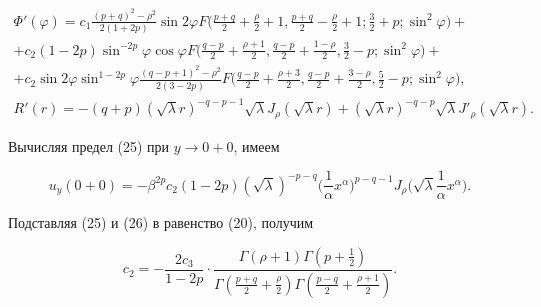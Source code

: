 \begin{gather*} 


\Phi'(\varphi)=c_1\frac{(p+q)^2-\rho^2}{2(1+2p)}\sin2\varphi F 


\bigg(\frac{p+q}{2}+\frac{\rho}{2}+1,\frac{p+q}{2} 


-\frac{\rho}{2}+1;\frac{3}{2}+p;\sin^2\varphi\bigg)+\\ 


% 


+c_2(1-2p)\sin^{-2p}\varphi\cos\varphi F\bigg( 


\frac{q-p}{2}+\frac{\rho+1}{2},\frac{q-p}{2} 


+\frac{1-\rho}{2},\frac{3}{2}-p;\sin^2\varphi\bigg)+ \\ 


% 


+c_2\sin2\varphi\sin^{1-2p}\varphi 


\frac{(q-p+1)^2-\rho^2}{2(3-2p)}F\bigg(\frac{q-p}{2} 


+\frac{\rho+3}{2},\frac{q-p}{2}+\frac{3-\rho}{2}, 


\frac{5}{2}-p;\sin^2\varphi\bigg), \\ 


% 


R'(r)=-(q+p)(\sqrt{\lambda}r)^{-q-p-1}\sqrt{\lambda} 


J_\rho(\sqrt{\lambda}r)+(\sqrt{\lambda}r)^{-q-p} 


\sqrt{\lambda}J'_\rho(\sqrt{\lambda}r). 


\end{gather*} 


 


Вычисляя предел (25) при $y\to0+0$, имеем 


\begin{equation} 


u_y(0+0)=-\beta^{2p}c_2(1-2p)(\sqrt{\lambda})^{-p-q} 


\bigg(\frac{1}{\alpha}x^\alpha \bigg)^{p-q-1}J_\rho 


\bigg(\sqrt{\lambda}\frac{1}{\alpha}x^\alpha\bigg). 


\end{equation} 


 


Подставляя (25) и (26) в равенство (20), получим 


\begin{equation} 


c_2=-\frac{2c_3}{1-2p}\cdot 


\frac{\Gamma(\rho+1)\Gamma(p+\frac{1}{2})} 


{\Gamma(\frac{p+q}{2}+\frac{\rho}{2})\Gamma(\frac{p-q}{2}+ 


\frac{\rho+1}{2})}. 


\end{equation} 


